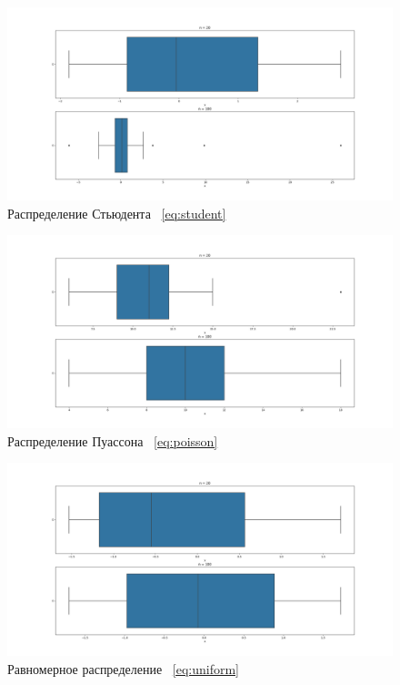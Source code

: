 \documentclass[12pt,a4paper]{article}
\begin{document}
	\newpage

	\begin{figure}[htbp!]
		\begin{center}
			\includegraphics[width = 1.12\linewidth]{graphics/lab2_student.png}
			\caption{Распределение Стьюдента \ \eqref{eq:student}}
		\end{center}
	\end{figure}

	\begin{figure}[htbp!]
		\begin{center}
			\includegraphics[width = 1.12\linewidth]{graphics/lab2_poisson.png}
			\caption{Распределение Пуассона \ \eqref{eq:poisson}}
		\end{center}
	\end{figure}

	\begin{figure}[htbp!]
		\begin{center}
			\includegraphics[width = 1.12\linewidth]{graphics/lab2_uniform.png}
			\caption{Равномерное распределение \ \eqref{eq:uniform}}
		\end{center}
	\end{figure}
\end{document}
